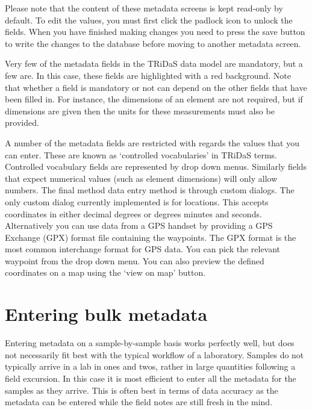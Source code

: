 Please note that the content of these metadata screens is kept read-only by default.  To edit the values, you must first click the padlock icon to unlock the fields.  When you have finished making changes you need to press the save button to write the changes to the database before moving to another metadata screen.

Very few of the metadata fields in the TRiDaS data model are mandatory, but a few are.  In this case, these fields are highlighted with a red background.  Note that whether a field is mandatory or not can depend on the other fields that have been filled in.  For instance, the dimensions of an element are not required, but if dimensions are given then the units for these measurements must also be provided.

A number of the metadata fields are restricted with regards the values that you can enter.  These are known as `controlled vocabularies' in TRiDaS terms.  Controlled vocabulary fields are represented by drop down menus.  Similarly fields that expect numerical values (such as element dimensions) will only allow numbers.  The final method data entry method is through custom dialogs.  The only custom dialog currently implemented is for locations.  This accepts coordinates in either decimal degrees or degrees minutes and seconds.  Alternatively you can use data from a GPS handset by providing a GPS Exchange (GPX) format file containing the waypoints. The GPX format is the most common interchange format for GPS data. You can pick the relevant waypoint from the drop down menu.  You can also preview the defined coordinates on a map using the `view on map' button. 



\section{Entering bulk metadata}
\label{txt:bulkentry}
Entering metadata on a sample-by-sample basis works perfectly well, but does not necessarily fit best with the typical workflow of a laboratory.  Samples do not typically arrive in a lab in ones and twos, rather in large quantities following a field excursion.  In this case it is most efficient to enter all the metadata for the samples as they arrive.  This is often best in terms of data accuracy as the metadata can be entered while the field notes are still fresh in the mind.

